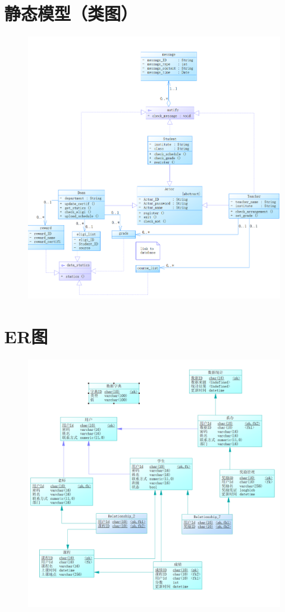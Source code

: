 \documentclass[12pt, a4paper, oneside]{ctexart}
\begin{document}
\section{静态模型（类图）}

\begin{figure}[H]
    \centering
    \includegraphics[width = 1\textwidth]{../pic/4/4.1.png}
\end{figure}

\section{ER图}

\begin{figure}[H]
    \centering
    \includegraphics[width = 1\textwidth]{../pic/5/5.1.png}
\end{figure}
\end{document}
